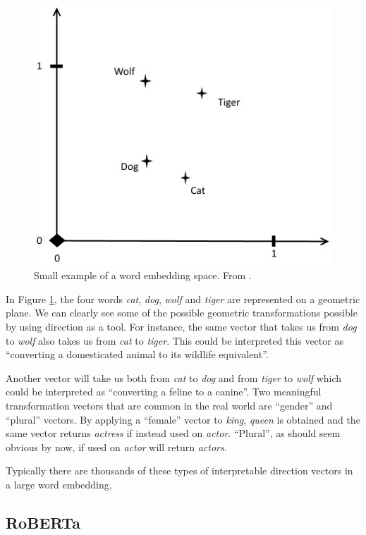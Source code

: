 \documentclass[nofilelist]{cslthse-msc}
\begin{document}
\begin{figure}[!ht]
\centering
\includegraphics[scale=0.8]{msccls/explanatory_images/embedding_direction.png} 
\caption{Small example of a word embedding space. From \citet{franoischollet2017learning}.}
\label{fig:direction}
\end{figure}


In Figure \ref{fig:direction}, the four words \textit{cat}, \textit{dog}, \textit{wolf} and \textit{tiger} are represented on a geometric plane. We can clearly see some of the possible geometric transformations possible by using direction as a tool. For instance, the same vector that takes us from \textit{dog} to \textit{wolf} also takes us from \textit{cat} to \textit{tiger}. This could be interpreted this vector as ``converting a domesticated animal to its wildlife equivalent''. 

Another vector will take us both from \textit{cat} to \textit{dog} and from \textit{tiger} to \textit{wolf} which could be interpreted as ``converting a feline to a canine''. Two meaningful transformation vectors that are common in the real world are ``gender'' and ``plural'' vectors. By applying a ``female'' vector to \textit{king}, \textit{queen} is obtained and the same vector returns \textit{actress} if instead used on \textit{actor}. ``Plural'', as should seem obvious by now, if used on \textit{actor} will return \textit{actors}. 

Typically there are thousands of these types of interpretable direction vectors in a large word embedding.

\subsection{RoBERTa}
\end{document}

